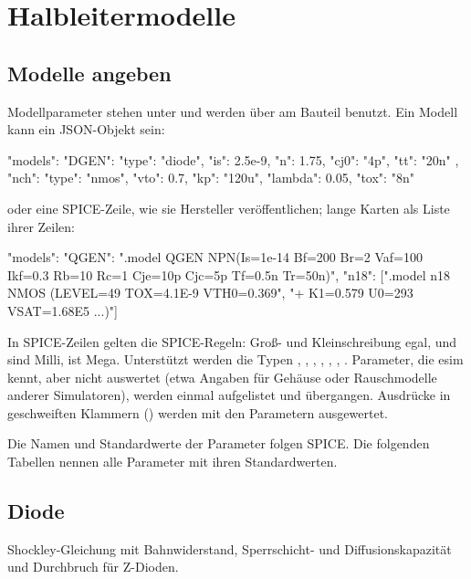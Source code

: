 \chapter{Halbleitermodelle}
\label{kap:format-modelle}

\section{Modelle angeben}

Modellparameter stehen unter  und werden über 
am Bauteil benutzt. Ein Modell kann ein JSON-Objekt sein:

\begin{json}
"models": {
  "DGEN": { "type": "diode", "is": 2.5e-9, "n": 1.75, "cj0": "4p", "tt": "20n" },
  "nch":  { "type": "nmos", "vto": 0.7, "kp": "120u", "lambda": 0.05, "tox": "8n" }
}
\end{json}

oder eine SPICE-Zeile, wie sie Hersteller veröffentlichen; lange Karten als
Liste ihrer Zeilen:

\begin{json}
"models": {
  "QGEN": ".model QGEN NPN(Is=1e-14 Bf=200 Br=2 Vaf=100 Ikf=0.3 Rb=10 Rc=1 Cje=10p Cjc=5p Tf=0.5n Tr=50n)",
  "n18":  [".model n18 NMOS (LEVEL=49 TOX=4.1E-9 VTH0=0.369",
           "+ K1=0.579 U0=293 VSAT=1.68E5 ...)"]
}
\end{json}

In SPICE-Zeilen gelten die SPICE-Regeln: Groß- und Kleinschreibung egal,
 und  sind Milli,  ist Mega. Unterstützt werden die
Typen , , , , ,
, . Parameter, die esim kennt, aber nicht auswertet
(etwa Angaben für Gehäuse oder Rauschmodelle anderer Simulatoren), werden
einmal aufgelistet und übergangen. Ausdrücke in geschweiften Klammern
() werden mit den Parametern ausgewertet.

Die Namen und Standardwerte der Parameter folgen SPICE. Die folgenden
Tabellen nennen alle Parameter mit ihren Standardwerten.

\section{Diode}

Shockley-Gleichung mit Bahnwiderstand, Sperrschicht- und
Diffusionskapazität und Durchbruch für Z-Dioden.

